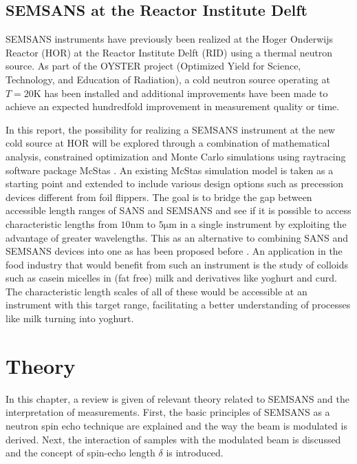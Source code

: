 \documentclass{article}
\newcommand{\targetrange}{$10 \unit{\nano\meter}$ to $5 \unit{\micro\meter}$ }
\begin{document}
\subsection{SEMSANS at the Reactor Institute Delft}


SEMSANS instruments have previously been realized at the Hoger Onderwijs Reactor (HOR) at the Reactor Institute Delft (RID) using a thermal neutron source. As part of the OYSTER project (Optimized Yield for Science, Technology, and Education of Radiation), a cold neutron source operating at $T=20 \unit{\kelvin}$ has been installed and additional improvements have been made to achieve an expected hundredfold improvement in measurement quality or time.

In this report, the possibility for realizing a SEMSANS instrument at the new cold source at HOR will be explored through a combination of mathematical analysis, constrained optimization and Monte Carlo simulations using raytracing software package McStas \cite{willendrup2020}. An existing McStas simulation model \cite{bouwman2021b} is taken as a starting point and extended to include various design options such as precession devices different from foil flippers. 
The goal is to bridge the gap between accessible length ranges of SANS and SEMSANS \cite{bouwman2021} and see if it is possible to access characteristic lengths from \targetrange in a single instrument by exploiting the advantage of greater wavelengths. This as an alternative to combining SANS and SEMSANS devices into one as has been proposed before \cite{bouwman2011}\cite{kusmin2017}. An application in the food industry that would benefit from such an instrument is the study of colloids such as casein micelles in (fat free) milk and derivatives like yoghurt and curd. The characteristic length scales of all of these would be accessible at an instrument with this target range, facilitating a better understanding of processes like milk turning into yoghurt. 

\newpage 
\section{Theory}
\label{c2:theory}
In this chapter, a review is given of relevant theory related to SEMSANS and the interpretation of measurements. First, the basic principles of SEMSANS as a neutron spin echo technique are explained and the way the beam is modulated is derived. Next, the interaction of samples with the modulated beam is discussed and the concept of spin-echo length $\delta$ is introduced.
\end{document}
